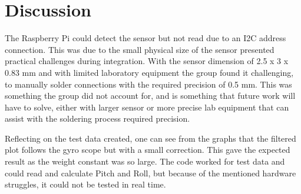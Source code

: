 \section{Discussion}
\label{section:disc}

The Raspberry Pi could detect the sensor but not read due to an I2C address connection. This was due to the small physical size of the sensor presented practical challenges during integration. With the sensor dimension of 2.5 x 3 x 0.83 mm and with limited laboratory equipment the group found it challenging, to manually solder connections with the required precision of 0.5 mm. This was something the group did not account for, and is something that future work will have to solve, either with larger sensor or more precise lab equipment that can assist with the soldering process required precision.

Reflecting on the test data created, one can see from the graphs that the filtered plot follows the gyro scope but with a small correction. This gave the expected result as the weight constant was so large. The code worked for test data and could read and calculate Pitch and Roll, but because of the mentioned hardware struggles, it could not be tested in real time. 

